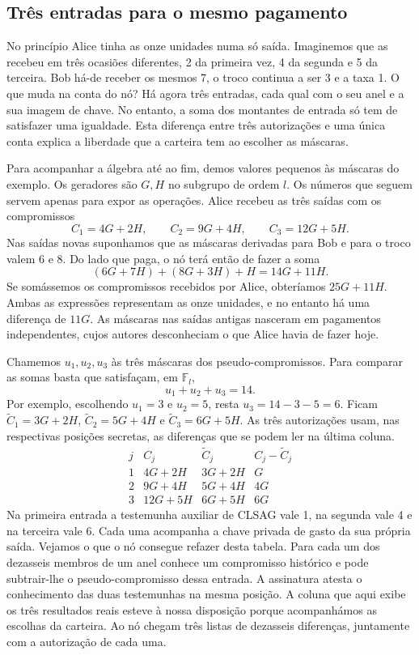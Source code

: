 \subsection{Três entradas para o mesmo pagamento}
\label{sec:tres-entradas-equilibrio}

No princípio Alice tinha as onze unidades numa só saída. Imaginemos
que as recebeu em três ocasiões diferentes, 2 da primeira vez, 4 da
segunda e 5 da terceira. Bob há-de receber os mesmos 7, o troco
continua a ser 3 e a taxa 1. O que muda na conta do nó? Há agora
três entradas, cada qual com o seu anel e a sua imagem de chave.
No entanto, a soma dos montantes de entrada só tem de satisfazer
uma igualdade. Esta diferença entre três autorizações e uma única
conta explica a liberdade que a carteira tem ao escolher as máscaras.

Para acompanhar a álgebra até ao fim, demos valores pequenos às
máscaras do exemplo. Os geradores são \(G,H\) no subgrupo de ordem
\(l\). Os números que seguem servem apenas para expor as operações.
Alice recebeu as três saídas com os compromissos
\[
       C_1=4G+2H,\qquad C_2=9G+4H,\qquad C_3=12G+5H .
\]
Nas saídas novas suponhamos que as máscaras derivadas para Bob e
para o troco valem 6 e 8. Do lado que paga, o nó terá então de fazer
a soma
\[
               (6G+7H)+(8G+3H)+H=14G+11H .
\]
Se somássemos os compromissos recebidos por Alice, obteríamos
\(25G+11H\). Ambas as expressões representam as onze unidades, e
no entanto há uma diferença de \(11G\). As máscaras nas saídas
antigas nasceram em pagamentos independentes, cujos autores
desconheciam o que Alice havia de fazer hoje.

Chamemos \(u_1,u_2,u_3\) às três máscaras dos pseudo-compromissos.
Para comparar as somas basta que satisfaçam, em \(\mathbb F_l\),
\[
                              u_1+u_2+u_3=14 .
\]
Por exemplo, escolhendo \(u_1=3\) e \(u_2=5\), resta
\(u_3=14-3-5=6\). Ficam \(\widetilde C_1=3G+2H\),
\(\widetilde C_2=5G+4H\) e \(\widetilde C_3=6G+5H\).
As três autorizações usam, nas respectivas posições secretas, as
diferenças que se podem ler na última coluna.
\[
\begin{array}{c|c|c|c}
 j & C_j &\widetilde C_j&C_j-\widetilde C_j \\ \hline
 1&4G+2H &3G+2H&G\\
 2&9G+4H &5G+4H&4G\\
 3&12G+5H&6G+5H&6G
\end{array}
\]
Na primeira entrada a testemunha auxiliar de CLSAG vale 1, na
segunda vale 4 e na terceira vale 6. Cada uma acompanha a chave
privada de gasto da sua própria saída. Vejamos o que o nó consegue
refazer desta tabela. Para cada um dos dezasseis membros de um anel
conhece um compromisso histórico e pode subtrair-lhe o
pseudo-compromisso dessa entrada. A assinatura atesta o conhecimento
das duas testemunhas na mesma posição. A coluna que aqui exibe os
três resultados reais esteve à nossa disposição porque acompanhámos
as escolhas da carteira. Ao nó chegam três listas de dezasseis
diferenças, juntamente com a autorização de cada uma.

